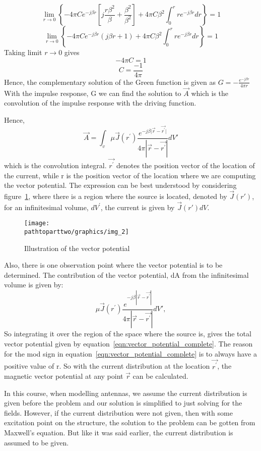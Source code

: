 \begin{dmath*}
\lim\limits_{r\rightarrow0} \left\lbrace-4\pi C e^{-j\beta r}\left[j\frac{r\beta^{2}}{\beta} +\frac{\beta^{2}}{\beta^{2}}\right] + 4\pi C\beta^{2}\int_{0}^{r}re^{-j\beta r}dr\right\rbrace = 1
\end{dmath*}
\begin{dmath*}
\lim\limits_{r\rightarrow0} \left\lbrace-4\pi C e^{-j\beta r}(j\beta r+1) + 4\pi C\beta^{2}\int_{0}^{r}re^{-j\beta r}dr\right\rbrace = 1
\end{dmath*}
Taking limit $r\rightarrow0$ gives
$$-4\pi C= 1$$
$$C = \frac{-1}{4\pi}$$
Hence, the complementary solution of the Green function is given as $ G= -\frac{e^{-j\beta r}}{4\pi r}$
With the impulse response, G we can find the solution to $\vec{A}$ which is the convolution of the impulse response with the driving function.

Hence, 
\begin{equation}
\vec{A}=\int_{v}\mu\vec{J}(r^{'}) \frac{e^{-j\beta\vert\vec{r}-\vec{r^{'}}\vert}}{4\pi|\vec{r}-\vec{r^{'}}|}dV'
\label{eqn:vector_potential_complete}
\end{equation}
which is the convolution integral. $\vec{r^{'}}$ denotes the position vector of the location of the current, while r is the position vector of the location where we are computing the vector potential. The expression can be best understood by considering figure~\ref{fig:img_2}, where there is a region where the source is located, denoted by $\vec{J}(r')$, for an infinitesimal volume, $dV^{'}$, the current is given by $\vec{J}(r')dV$.
\begin{figure}[h]
\centering
\texttt{[image: \\pathtoparttwo/graphics/img\_2]}
\caption{Illustration of the vector potential}
\label{fig:img_2}
\end{figure}

Also, there is one observation point where the vector potential is to be determined. The contribution of the vector potential, dA from the infinitesimal volume is given by: 
\begin{equation}
\mu\vec{J}(r^{'}) \frac{e^{-j\beta|\vec{r}-\vec{r^{'}}|}}{4\pi|\vec{r}-\vec{r^{'}}|}dV',
\end{equation}
So integrating it over the region of the space where the source is, gives the total vector potential given by equation~\eqref{eqn:vector_potential_complete}. The reason for the mod sign in equation~\eqref{eqn:vector_potential_complete} is to always have a positive value of r. So with the current distribution at the location $\vec{r^{'}}$, the magnetic vector potential at any point $\vec{r}$ can be calculated.

In this course, when modelling antennas, we assume the current distribution is given before the problem and our solution is simplified to just solving for the fields. However, if the current distribution were not given, then with some excitation point on the structure, the solution to the problem can be gotten from Maxwell's equation. But like it was said earlier, the current distribution is assumed to be given.

